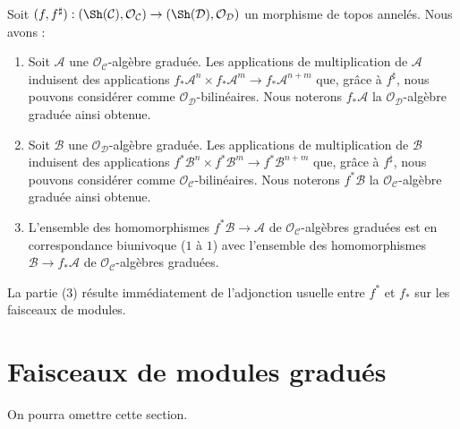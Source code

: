 \begin{remark}
\label{remark-functoriality-ga}
Soit $(f, f^\sharp) : (\Sh(\mathcal{C}), \mathcal{O}_\mathcal{C})
\to (\Sh(\mathcal{D}), \mathcal{O}_\mathcal{D})$ un
morphisme de topos annelés. Nous avons :
\begin{enumerate}
\item Soit $\mathcal{A}$ une $\mathcal{O}_\mathcal{C}$-algèbre graduée. Les
applications de multiplication de $\mathcal{A}$ induisent des applications
$f_*\mathcal{A}^n \times f_*\mathcal{A}^m \to f_*\mathcal{A}^{n + m}$ que,
grâce à $f^\sharp$, nous pouvons considérer comme $\mathcal{O}_\mathcal{D}$-bilinéaires.
Nous noterons $f_*\mathcal{A}$ la
$\mathcal{O}_\mathcal{D}$-algèbre graduée ainsi obtenue.
\item Soit $\mathcal{B}$ une
$\mathcal{O}_\mathcal{D}$-algèbre graduée. Les
applications de multiplication de $\mathcal{B}$ induisent des applications
$f^*\mathcal{B}^n \times f^*\mathcal{B}^m \to f^*\mathcal{B}^{n + m}$ que,
grâce à $f^\sharp$, nous pouvons considérer comme $\mathcal{O}_\mathcal{C}$-bilinéaires.
Nous noterons $f^*\mathcal{B}$
la $\mathcal{O}_\mathcal{C}$-algèbre graduée ainsi obtenue.
\item L'ensemble des homomorphismes $f^*\mathcal{B} \to \mathcal{A}$
de $\mathcal{O}_\mathcal{C}$-algèbres graduées est en
correspondance biunivoque ($1$ à $1$) avec l'ensemble des homomorphismes
$\mathcal{B} \to f_*\mathcal{A}$ de $\mathcal{O}_\mathcal{C}$-algèbres graduées.
\end{enumerate} La
partie (3) résulte immédiatement de l'adjonction usuelle entre $f^*$ et $f_*$ sur les
faisceaux de modules.
\end{remark}




\section{Faisceaux de modules gradués}
\label{section-graded-modules}

\noindent
On pourra omettre cette section.

